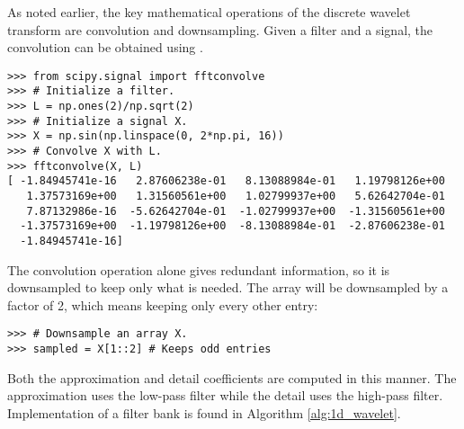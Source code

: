 \begin{comment}
At each stage of the algorithm, we filter the signal into an approximation and its details.
Note that the algorithm returns a sequence of one dimensional arrays
\[A_n, D_n, D_{n-1}, \ldots, D_1.\]
If the input signal $X$ has length $2^m$ for
some $m \geq n$ and we are using the Haar wavelet, then $A_n$ has length $2^{m-n}$, and $D_i$ has length $2^{m-i}$
for $i=1,\ldots,n$. The arrays $D_i$ are outputs of the high-pass filter, and thus represent high-frequency
details.
Hence, these arrays are known as \emph{details}.
The array $A_n$ is computed by recursively passing the signal through the low-pass filter, and hence it
represents the low-frequency structure in the signal.
In fact, $A_n$ can be seen as a smoothed approximation of the original signal, and is called the \emph{approximation}.
\end{comment}

As noted earlier, the key mathematical operations of the discrete wavelet transform are convolution and downsampling.
Given a filter and a signal, the convolution can be obtained using .
\begin{lstlisting}
>>> from scipy.signal import fftconvolve
>>> # Initialize a filter.
>>> L = np.ones(2)/np.sqrt(2)
>>> # Initialize a signal X.
>>> X = np.sin(np.linspace(0, 2*np.pi, 16))
>>> # Convolve X with L.
>>> fftconvolve(X, L)
[ -1.84945741e-16   2.87606238e-01   8.13088984e-01   1.19798126e+00
   1.37573169e+00   1.31560561e+00   1.02799937e+00   5.62642704e-01
   7.87132986e-16  -5.62642704e-01  -1.02799937e+00  -1.31560561e+00
  -1.37573169e+00  -1.19798126e+00  -8.13088984e-01  -2.87606238e-01
  -1.84945741e-16]
\end{lstlisting}

The convolution operation alone gives redundant information, so it is downsampled to keep only what is needed.
The array will be downsampled by a factor of 2, which means keeping only every other entry:

\begin{lstlisting}
>>> # Downsample an array X.
>>> sampled = X[1::2] # Keeps odd entries
\end{lstlisting}

Both the approximation and detail coefficients are computed in this manner.  The approximation uses the low-pass filter while the detail uses the high-pass filter.
Implementation of a filter bank is found in Algorithm \ref{alg:1d_wavelet}.

